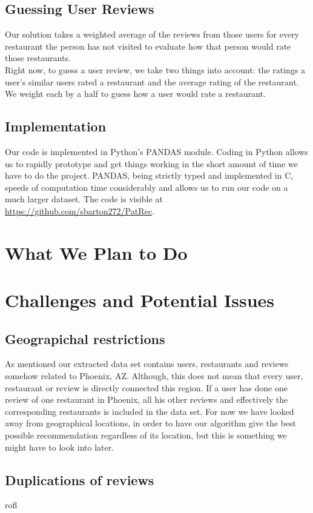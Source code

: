 \documentclass[10pt,twocolumn,letterpaper]{article}
\begin{document}
\subsection{Guessing User Reviews}
Our solution takes a weighted average of the reviews from those users for every restaurant the person has not visited to evaluate how that person would rate those restaurants.
\\[0.5em]
\indent Right now, to guess a user review, we take two things into account: the ratings a user's similar users rated a restaurant and the average rating of the restaurant. We weight each by a half to guess how a user would rate a restaurant.
\subsection{Implementation}
Our code is implemented in Python's PANDAS module. Coding in Python allows us to rapidly prototype and get things working in the short amount of time we have to do the project. PANDAS, being strictly typed and implemented in C, speeds of computation time considerably and allows us to run our code on a much larger dataset. The code is visible at \url{https://github.com/sbarton272/PatRec}.

\section{What We Plan to Do}

\section{Challenges and Potential Issues}
\subsection{Geograpichal restrictions}
As mentioned our extracted data set contains users, restaurants and reviews somehow related to Phoenix, AZ. Although, this does not mean that every user, restaurant or review is directly connected this region. If a user has done one review of one restaurant in Phoenix, all his other reviews and effectively the corresponding restaurants is included in the data set. For now we have looked away from geographical locations, in order to have our algorithm give the best possible recommendation regardless of its location, but this is something we might have to look into later.

\subsection{Duplications of reviews}
rofl

{\small

}
\end{document}
